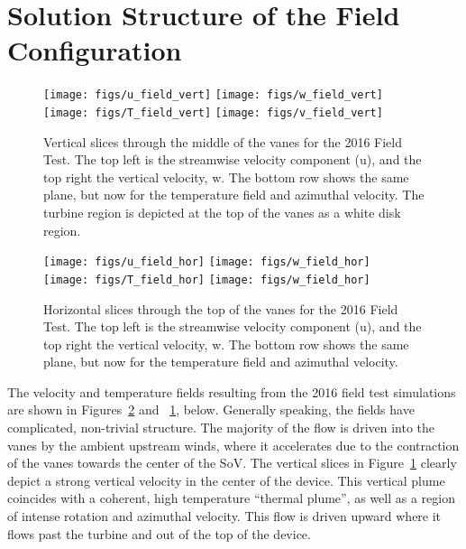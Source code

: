 \section{Solution Structure of the Field Configuration}
\label{subsec:field_predict}

\begin{figure}[!htb]
  \centering
  \texttt{[image: figs/u\_field\_vert]}
  \hfill
  \texttt{[image: figs/w\_field\_vert]}
  \\
  \texttt{[image: figs/T\_field\_vert]}
  \hfill
  \texttt{[image: figs/v\_field\_vert]}
  \label{fig:field_vert}
 \caption{Vertical slices through the middle of the vanes for the
 2016 Field Test. The top left is the streamwise velocity component
 (u), and the top right the vertical velocity, w. The bottom row shows
 the same plane, but now for the temperature field and azimuthal
 velocity. The turbine region is depicted at the top of the vanes as a
 white disk region.} 
\end{figure}

\begin{figure}[!htb]
  \centering
  \texttt{[image: figs/u\_field\_hor]}
  \hfill
  \texttt{[image: figs/w\_field\_hor]}
  \\
  \texttt{[image: figs/T\_field\_hor]}
  \hfill
  \texttt{[image: figs/w\_field\_hor]}
  \label{fig:field_hor}
 \caption{Horizontal slices through the top of the vanes for the
 2016 Field Test. The top left is the streamwise velocity component
 (u), and the top right the vertical velocity, w. The bottom row shows
 the same plane, but now for the temperature field and azimuthal velocity.} 
\end{figure}

The velocity and temperature fields resulting from the 2016 field test 
simulations are shown in Figures~\ref{fig:field_hor} and
~\ref{fig:field_vert}, below. Generally speaking, the fields have
complicated, non-trivial structure. The majority of the flow is driven
into the vanes by the ambient upstream winds, where it accelerates due
to the contraction of the vanes towards the center of the SoV.
The vertical slices in Figure~\ref{fig:field_vert} clearly depict a
strong vertical velocity in the center of the device. This vertical
plume coincides with a coherent, high temperature ``thermal plume'', as
well as a region of intense rotation and azimuthal velocity. This flow
is driven upward where it flows past the turbine and out of the top of
the device. 

